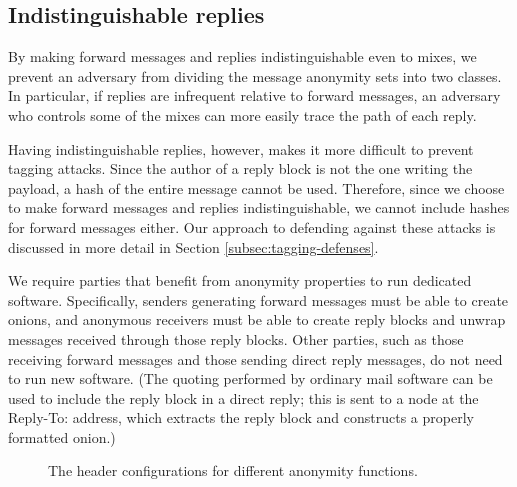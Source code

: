\documentclass[11pt]{IEEEtran}
\begin{document}
\subsection{Indistinguishable replies}
\label{subsec:header-swap}

By making forward messages and replies indistinguishable even to mixes,
we prevent an
adversary from dividing the message anonymity sets into two classes. In
particular, if replies are infrequent relative to forward messages,
an adversary who controls some of the mixes can more easily trace the
path of each reply.

Having indistinguishable replies, however, makes it more difficult to
prevent tagging attacks.  Since the author of a reply block is not the
one writing the payload, a hash of the entire message cannot be used.
Therefore, since we choose to make forward messages and replies
indistinguishable, we cannot include hashes for forward messages either.
Our approach to defending against these attacks is discussed in more
detail in Section \ref{subsec:tagging-defenses}.

We require parties that benefit from anonymity properties to run dedicated
software.  Specifically, senders generating forward messages must be able
to create onions, and anonymous receivers must be able to create reply blocks
and unwrap messages received through those reply blocks. Other parties,
such as those receiving forward messages and those sending direct reply
messages, do not need to run new software. (The quoting
performed by ordinary mail software can be used to include the reply
block in a direct reply; this is sent to a node at the Reply-To:
address, which extracts the reply block and constructs a properly
formatted onion.)

\begin{figure}
\begin{center}
\caption{The header configurations for different anonymity functions.} 
\end{center}
\end{figure}
\end{document}
